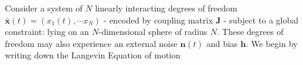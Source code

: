 Consider a system of $N$ linearly interacting degrees of freedom $\mathbf{\bar x}(t) = (x_1(t),\cdots x_N)$ - encoded by coupling matrix $\mathbf{J}$ - subject to a global constraint: lying on an $N$-dimensional sphere of radius $N$. These degrees of freedom may also experience an external noise $\mathbf{n}(t)$ and bias $\mathbf{h}$. We begin by writing down the Langevin Equation of motion